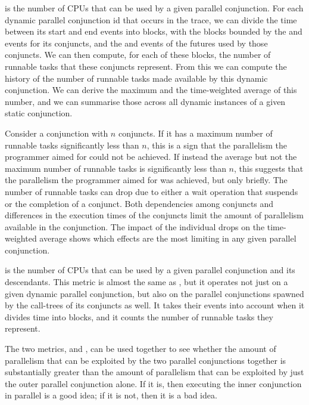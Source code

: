 is the number of CPUs that can be used by a given parallel conjunction.
For each dynamic parallel conjunction id that occurs in the trace,
we can divide the time between its start and end events into blocks,
with the blocks bounded by
the  and  events for its
conjuncts,
and the  and  events
of the futures used by those conjuncts.
We can then compute, for each of these blocks,
the number of runnable tasks that these conjuncts represent.
From this we can compute the history of the number
of runnable tasks made available by this dynamic conjunction.
We can derive the maximum and the time-weighted average of this number,
and we can summarise those
across all dynamic instances of a given static conjunction.

Consider a conjunction with $n$ conjuncts.
If it has a maximum number of runnable tasks
significantly less than $n$,
this is a sign that the parallelism the programmer aimed for
could not be achieved.
If instead the average but not the maximum number of runnable tasks
is significantly less than $n$,
this suggests that the parallelism the programmer aimed for was achieved,
but only briefly.
The number of runnable tasks can drop due to
either a wait operation that suspends or the completion of a conjunct.
Both dependencies among conjuncts
and differences in the execution times of the conjuncts
limit the amount of parallelism available in the conjunction.
The impact of the individual drops on the time-weighted average
shows which effects are the most limiting in any given parallel conjunction.

is the number of CPUs that can be used by a given parallel conjunction
and its descendants.
This metric is almost the same as ,
but it operates
not just on a given dynamic parallel conjunction,
but also on the parallel conjunctions
spawned by the call-trees of its conjuncts as well.
It takes their events into account when it divides time into blocks,
and it counts the number of runnable tasks they represent.

The two metrics,
 and
,
can be used together to see whether
the amount of parallelism that can be exploited
by the two parallel conjunctions together is substantially greater than
the amount of parallelism that can be exploited
by just the outer parallel conjunction alone.
If it is, then executing the inner conjunction in parallel is a good idea;
if it is not, then it is a bad idea.

